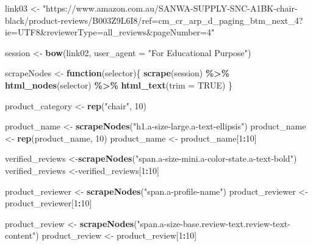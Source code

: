 \documentclass[
]{article}
\newenvironment{Shaded}{\begin{snugshade}}{\end{snugshade}}
\newcommand{\AttributeTok}[1]{\textcolor[rgb]{0.13,0.29,0.53}{#1}}
\newcommand{\ConstantTok}[1]{\textcolor[rgb]{0.56,0.35,0.01}{#1}}
\newcommand{\ControlFlowTok}[1]{\textcolor[rgb]{0.13,0.29,0.53}{\textbf{#1}}}
\newcommand{\DecValTok}[1]{\textcolor[rgb]{0.00,0.00,0.81}{#1}}
\newcommand{\FunctionTok}[1]{\textcolor[rgb]{0.13,0.29,0.53}{\textbf{#1}}}
\newcommand{\NormalTok}[1]{#1}
\newcommand{\OtherTok}[1]{\textcolor[rgb]{0.56,0.35,0.01}{#1}}
\newcommand{\SpecialCharTok}[1]{\textcolor[rgb]{0.81,0.36,0.00}{\textbf{#1}}}
\newcommand{\StringTok}[1]{\textcolor[rgb]{0.31,0.60,0.02}{#1}}
\begin{document}
\begin{Shaded}
\begin{Highlighting}[]
\NormalTok{link03 }\OtherTok{\textless{}{-}} \StringTok{"https://www.amazon.com.au/SANWA{-}SUPPLY{-}SNC{-}A1BK{-}chair{-}black/product{-}reviews/B003Z9L6I8/ref=cm\_cr\_arp\_d\_paging\_btm\_next\_4?ie=UTF8\&reviewerType=all\_reviews\&pageNumber=4"}


\NormalTok{  session }\OtherTok{\textless{}{-}} \FunctionTok{bow}\NormalTok{(link02,}
               \AttributeTok{user\_agent =} \StringTok{"For Educational Purpose"}\NormalTok{)}

\NormalTok{  scrapeNodes }\OtherTok{\textless{}{-}} \ControlFlowTok{function}\NormalTok{(selector)\{}
    \FunctionTok{scrape}\NormalTok{(session) }\SpecialCharTok{\%\textgreater{}\%}
      \FunctionTok{html\_nodes}\NormalTok{(selector) }\SpecialCharTok{\%\textgreater{}\%}
      \FunctionTok{html\_text}\NormalTok{(}\AttributeTok{trim =} \ConstantTok{TRUE}\NormalTok{)}
\NormalTok{  \}}

\NormalTok{  product\_category }\OtherTok{\textless{}{-}} \FunctionTok{rep}\NormalTok{(}\StringTok{"chair"}\NormalTok{, }\DecValTok{10}\NormalTok{)}

\NormalTok{  product\_name }\OtherTok{\textless{}{-}} \FunctionTok{scrapeNodes}\NormalTok{(}\StringTok{"h1.a{-}size{-}large.a{-}text{-}ellipsis"}\NormalTok{)}
\NormalTok{  product\_name }\OtherTok{\textless{}{-}} \FunctionTok{rep}\NormalTok{(product\_name, }\DecValTok{10}\NormalTok{)}
\NormalTok{  product\_name }\OtherTok{\textless{}{-}}\NormalTok{ product\_name[}\DecValTok{1}\SpecialCharTok{:}\DecValTok{10}\NormalTok{]}
  
\NormalTok{  verified\_reviews }\OtherTok{\textless{}{-}}\FunctionTok{scrapeNodes}\NormalTok{(}\StringTok{"span.a{-}size{-}mini.a{-}color{-}state.a{-}text{-}bold"}\NormalTok{)}
\NormalTok{  verified\_reviews }\OtherTok{\textless{}{-}}\NormalTok{verified\_reviews[}\DecValTok{1}\SpecialCharTok{:}\DecValTok{10}\NormalTok{]}
  
\NormalTok{  product\_reviewer }\OtherTok{\textless{}{-}} \FunctionTok{scrapeNodes}\NormalTok{(}\StringTok{"span.a{-}profile{-}name"}\NormalTok{)}
\NormalTok{  product\_reviewer }\OtherTok{\textless{}{-}}\NormalTok{ product\_reviewer[}\DecValTok{1}\SpecialCharTok{:}\DecValTok{10}\NormalTok{]}
  
\NormalTok{  product\_review }\OtherTok{\textless{}{-}} \FunctionTok{scrapeNodes}\NormalTok{(}\StringTok{"span.a{-}size{-}base.review{-}text.review{-}text{-}content"}\NormalTok{)}
\NormalTok{  product\_review }\OtherTok{\textless{}{-}}\NormalTok{ product\_review[}\DecValTok{1}\SpecialCharTok{:}\DecValTok{10}\NormalTok{]}
  

\end{Highlighting}
\end{Shaded}
\end{document}
